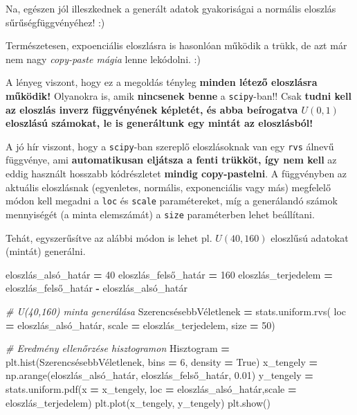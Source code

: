 \documentclass[
]{book}
\newenvironment{Shaded}{\begin{snugshade}}{\end{snugshade}}
\newcommand{\CommentTok}[1]{\textcolor[rgb]{0.56,0.35,0.01}{\textit{#1}}}
\newcommand{\DecValTok}[1]{\textcolor[rgb]{0.00,0.00,0.81}{#1}}
\newcommand{\FloatTok}[1]{\textcolor[rgb]{0.00,0.00,0.81}{#1}}
\newcommand{\NormalTok}[1]{#1}
\newcommand{\OperatorTok}[1]{\textcolor[rgb]{0.81,0.36,0.00}{\textbf{#1}}}
\newcommand{\VariableTok}[1]{\textcolor[rgb]{0.00,0.00,0.00}{#1}}
\begin{document}
Na, egészen jól illeszkednek a generált adatok gyakoriságai a normális eloszlás sűrűségfüggvényéhez! :)

Természetesen, expoenciális eloszlásra is hasonlóan működik a trükk, de azt már nem nagy \emph{copy-paste mágia} lenne lekódolni. :)

A lényeg viszont, hogy ez a megoldás tényleg \textbf{minden létező eloszlásra működik!} Olyanokra is, amik \textbf{nincsenek benne} a \texttt{scipy}-ban!! Csak \textbf{tudni kell az eloszlás inverz függvényének képletét, és abba beírogatva \(U(0,1)\) eloszlású számokat, le is generáltunk egy mintát az eloszlásból!}

A jó hír viszont, hogy a \texttt{scipy}-ban szereplő eloszlásoknak van egy \texttt{rvs} álnevű függvénye, ami \textbf{automatikusan eljátsza a fenti trükköt, így nem kell} az eddig használt hosszabb kódrészletet \textbf{mindig copy-pastelni}. A függvényben az aktuális eloszlásnak (egyenletes, normális, exponenciális vagy más) megfelelő módon kell megadni a \texttt{loc} és \texttt{scale} paramétereket, míg a generálandó számok mennyiségét (a minta elemszámát) a \texttt{size} paraméterben lehet beállítani.

Tehát, egyszerűsítve az alábbi módon is lehet pl. \(U(40,160)\) eloszlűsú adatokat (mintát) generálni.

\begin{Shaded}
\begin{Highlighting}[]
\NormalTok{eloszlás\_alsó\_határ }\OperatorTok{=} \DecValTok{40}
\NormalTok{eloszlás\_felső\_határ }\OperatorTok{=} \DecValTok{160}
\NormalTok{eloszlás\_terjedelem }\OperatorTok{=}\NormalTok{ eloszlás\_felső\_határ }\OperatorTok{{-}}\NormalTok{ eloszlás\_alsó\_határ}

\CommentTok{\# U(40,160) minta generálása}
\NormalTok{SzerencsésebbVéletlenek }\OperatorTok{=}\NormalTok{ stats.uniform.rvs(}
\NormalTok{  loc }\OperatorTok{=}\NormalTok{ eloszlás\_alsó\_határ,}
\NormalTok{  scale }\OperatorTok{=}\NormalTok{ eloszlás\_terjedelem,}
\NormalTok{  size }\OperatorTok{=} \DecValTok{50}\NormalTok{)}

\CommentTok{\# Eredmény ellenőrzése hisztogramon}
\NormalTok{Hisztogram }\OperatorTok{=}\NormalTok{ plt.hist(SzerencsésebbVéletlenek, bins }\OperatorTok{=} \DecValTok{6}\NormalTok{, density }\OperatorTok{=} \VariableTok{True}\NormalTok{)}
\NormalTok{x\_tengely }\OperatorTok{=}\NormalTok{ np.arange(eloszlás\_alsó\_határ, eloszlás\_felső\_határ, }\FloatTok{0.01}\NormalTok{)}
\NormalTok{y\_tengely }\OperatorTok{=}\NormalTok{ stats.uniform.pdf(x }\OperatorTok{=}\NormalTok{ x\_tengely, loc }\OperatorTok{=}\NormalTok{ eloszlás\_alsó\_határ,scale }\OperatorTok{=}\NormalTok{ eloszlás\_terjedelem)}
\NormalTok{plt.plot(x\_tengely, y\_tengely)}
\NormalTok{plt.show()}
\end{Highlighting}
\end{Shaded}
\end{document}
